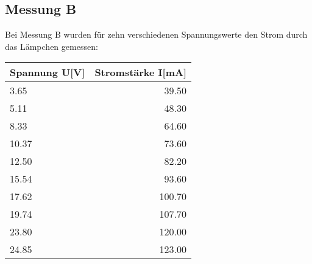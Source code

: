 \documentclass[12pt, a4paper, twoside]{article}
\begin{document}
    \subsection{Messung B}
    Bei Messung B wurden für zehn verschiedenen Spannungswerte den Strom durch das Lämpchen gemessen:\\
    \begin{center}
        \begin{tabular}{l|r}
            \textbf{Spannung U[V]} & \textbf{Stromstärke I[mA]}\\
            \hline
            3.65 & 39.50\\
            5.11 & 48.30\\
            8.33 & 64.60\\
            10.37 & 73.60\\
            12.50 & 82.20\\
            15.54 & 93.60\\
            17.62 & 100.70\\
            19.74 & 107.70\\
            23.80 & 120.00\\
            24.85 & 123.00
        \end{tabular}
    \end{center}
    \newpage
\end{document}
